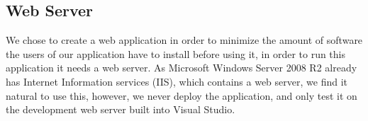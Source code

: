 \subsection{Web Server}
\label{subsec:webserver}


We chose to create a web application in order to minimize the amount of software the users of our application have to install before using it, in order to run this application it needs a web server. As Microsoft Windows Server 2008 R2 already has Internet Information services (IIS), which contains a web server, we find it natural to use this, however, we never deploy the application, and only test it on the development web server built into Visual Studio.



